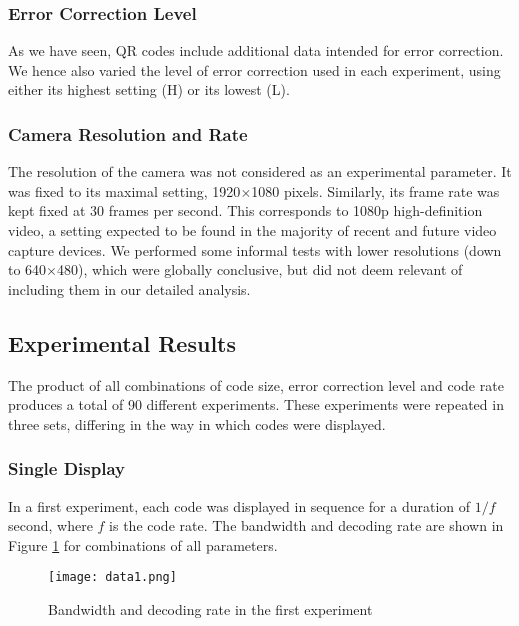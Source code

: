 \subsubsection{Error Correction Level}

As we have seen, QR codes include additional data intended for error correction. We hence also varied the level of error correction used in each experiment, using either its highest setting (H) or its lowest (L).

\subsubsection{Camera Resolution and Rate}

The resolution of the camera was not considered as an experimental parameter. It was fixed to its maximal setting, 1920$\times$1080 pixels. Similarly, its frame rate was kept fixed at 30 frames per second. This corresponds to 1080p high-definition video, a setting expected to be found in the majority of recent and future video capture devices. We performed some informal tests with lower resolutions (down to 640$\times$480), which were globally conclusive, but did not deem relevant of including them in our detailed analysis.

\subsection{Experimental Results}

The product of all combinations of code size, error correction level and code rate produces a total of 90 different experiments. These experiments were repeated in three sets, differing in the way in which codes were displayed.

\subsubsection{Single Display}

In a first experiment, each code was displayed in sequence for a duration of $1/f$ second, where $f$ is the code rate. The bandwidth and decoding rate are shown in Figure \ref{img-exp1} for combinations of all parameters.

\begin{figure}
\begin{center}
\centering
\texttt{[image: data1.png]}
\caption{Bandwidth and decoding rate in the first experiment}
\label{img-exp1}
\end{center}
\end{figure}

